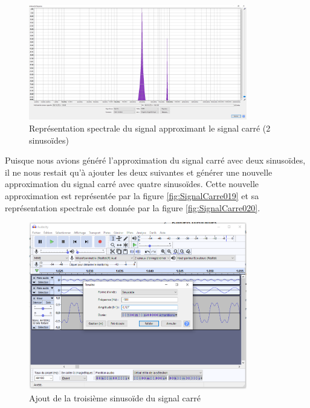 \documentclass[a4paper]{article}
\begin{document}
\begin{figure}[H]
    \centering
    \includegraphics[width=0.85\textwidth]{images/SignalCarre011.PNG}
    \caption{Représentation spectrale du signal approximant le signal carré (2 sinusoïdes)}
    \label{fig:SignalCarre011}
\end{figure}


Puisque nous avions généré l'approximation du signal carré avec deux sinusoïdes, il ne nous restait qu'à ajouter les deux suivantes et générer une nouvelle approximation du signal carré avec quatre sinusoïdes. Cette nouvelle approximation est représentée par la figure \ref{fig:SignalCarre019} et sa représentation spectrale est donnée par la figure \ref{fig:SignalCarre020}.


\begin{figure}[H]
    \centering
    \includegraphics[width=0.85\textwidth]{images/SignalCarre012.PNG}
    \caption{Ajout de la troisième sinusoïde du signal carré}
    \label{fig:SignalCarre012}
\end{figure}
\end{document}
